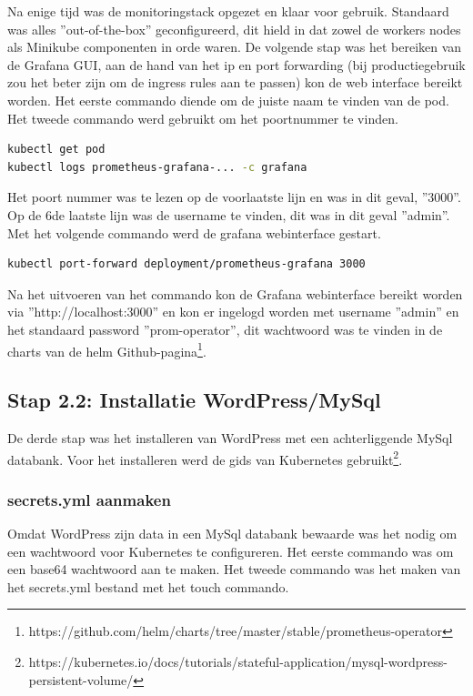 Na enige tijd was de monitoringstack opgezet en klaar voor gebruik. Standaard was alles ''out-of-the-box'' geconfigureerd, dit hield in dat zowel de workers nodes als Minikube componenten in orde waren. De volgende stap was het bereiken van de Grafana GUI, aan de hand van het ip en port forwarding (bij productiegebruik zou het beter zijn om de ingress rules aan te passen) kon de web interface bereikt worden. Het eerste commando diende om de juiste naam te vinden van de pod. Het tweede commando werd gebruikt om het poortnummer te vinden.

\begin{lstlisting}[language=bash,caption={prometheus-grafana naam/poort}]
kubectl get pod
kubectl logs prometheus-grafana-... -c grafana  
\end{lstlisting}

Het poort nummer was te lezen op de voorlaatste lijn en was in dit geval, ''3000''. Op de 6de laatste lijn was de username te vinden, dit was in dit geval ''admin''. Met het volgende commando werd de grafana webinterface gestart. 

\begin{lstlisting}[language=bash,caption={port forward}]
kubectl port-forward deployment/prometheus-grafana 3000
\end{lstlisting}

Na het uitvoeren van het commando kon de Grafana webinterface bereikt worden via ''http://localhost:3000'' en kon er ingelogd worden met username ''admin'' en het standaard password ''prom-operator'', dit wachtwoord was te vinden in de charts van de helm Github-pagina\footnote{https://github.com/helm/charts/tree/master/stable/prometheus-operator}.

\subsection{Stap 2.2: Installatie WordPress/MySql}

De derde stap was het installeren van WordPress met een achterliggende MySql databank. Voor het installeren werd de gids van Kubernetes gebruikt\footnote{https://kubernetes.io/docs/tutorials/stateful-application/mysql-wordpress-persistent-volume/}.

\subsubsection{secrets.yml aanmaken}

Omdat WordPress zijn data in een MySql databank bewaarde was het nodig om een wachtwoord voor Kubernetes te configureren. Het eerste commando was om een base64 wachtwoord aan te maken. Het tweede commando was het maken van het secrets.yml bestand met het touch commando.

